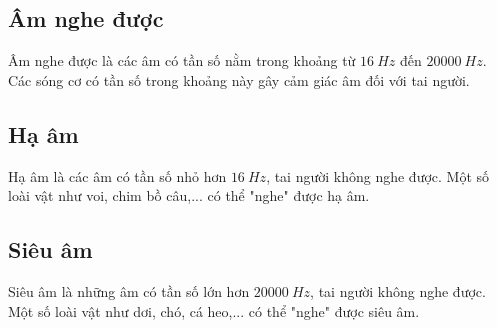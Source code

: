 \subsection{Âm nghe được}
Âm nghe được là các âm có tần số nằm trong khoảng từ $\SI{16}{Hz}$ đến $\SI{20000}{Hz}$. Các sóng cơ có tần số trong khoảng này gây cảm giác âm đối với tai người.
\subsection{Hạ âm}
Hạ âm là các âm có tần số nhỏ hơn $\SI{16}{Hz}$, tai người không nghe được. Một số loài vật như voi, chim bồ câu,... có thể "nghe" được hạ âm.
\subsection{Siêu âm}
Siêu âm là những âm có tần số lớn hơn $\SI{20000}{Hz}$, tai người không nghe được. Một số loài vật như dơi, chó, cá heo,... có thể "nghe" được siêu âm.
